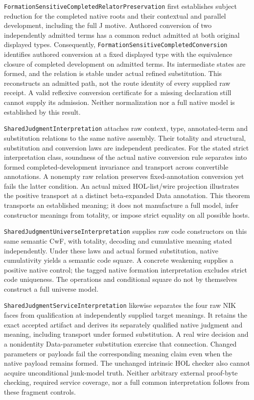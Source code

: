 \documentclass[11pt]{article}
\theoremstyle{definition}
\theoremstyle{remark}
\begin{document}
\nolinkurl{FormationSensitiveCompletedRelatorPreservation} first establishes
subject reduction for the completed native roots and their contextual and
parallel development, including the full J motive. Authored conversion of
two independently admitted terms has a common reduct admitted at both
original displayed types. Consequently,
\nolinkurl{FormationSensitiveCompletedConversion} identifies authored
conversion at a fixed displayed type with the equivalence closure of
completed development on admitted terms. Its intermediate states are formed,
and the relation is stable under actual refined substitution. This
reconstructs an admitted path, not the route identity of every supplied raw
receipt. A valid reflexive conversion certificate for a missing declaration
still cannot supply its admission. Neither normalization nor a full native
model is established by this result.

\nolinkurl{SharedJudgmentInterpretation} attaches raw context, type,
annotated-term and substitution relations to the same native assembly.
Their totality and structural, substitution and conversion laws are independent
predicates. For the stated strict interpretation class, soundness of the
actual native conversion rule separates into formed completed-development
invariance and transport across convertible annotations. A nonempty raw
relation preserves fixed-annotation conversion yet fails the latter condition.
An actual mixed HOL-list/wire projection illustrates the positive transport
at a distinct beta-expanded Data annotation. This theorem transports an
established meaning; it does not manufacture a full model, infer constructor
meanings from totality, or impose strict equality on all possible hosts.

\nolinkurl{SharedJudgmentUniverseInterpretation} supplies raw code constructors
on this same semantic CwF, with totality, decoding and cumulative meaning
stated independently. Under these laws and actual formed substitution, native
cumulativity yields a semantic code square. A concrete weakening supplies a
positive native control; the tagged native formation interpretation excludes
strict code uniqueness. The operations and conditional square do not by
themselves construct a full universe model.

\nolinkurl{SharedJudgmentServiceInterpretation} likewise separates the four
raw NIK faces from qualification at independently supplied target meanings.
It retains the exact accepted artifact and derives its separately qualified
native judgment and meaning, including transport under formed substitution.
A real wire decision and a nonidentity Data-parameter substitution exercise
that connection. Changed parameters or payloads fail the corresponding
meaning claim even when the native payload remains formed. The unchanged
intrinsic HOL checker also cannot acquire unconditional junk-model truth.
Neither arbitrary external proof-byte checking, required service coverage,
nor a full common interpretation follows from these fragment controls.
\end{document}
